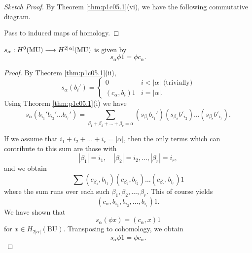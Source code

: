 \documentclass[../main]{subfiles}
\begin{document}
\begin{proof}[Sketch Proof]
By Theorem \ref{thm:p1c05.1}(vi), we have the following commutative diagram.

\begin{center}
\end{center}

Pass to induced maps of homology.
\end{proof} 

\begin{corollary}
\label{cor:p1c05.3}
$s_\alpha : H^0(\mathrm{MU}) \overset{}{\longrightarrow} H^{2|\alpha|} (\mathrm{MU})$ is given by $$s_\alpha \phi 1 = \phi c_\alpha.$$
\end{corollary}

\begin{proof}
By Theorem \ref{thm:p1c05.1}(ii), $$s_\alpha(b_i') = \begin{cases}0 & i < |\alpha| \text { (trivially)} \\ (c_\alpha, b_i) 1 & i = |\alpha|.\end{cases}$$ Using Theorem \ref{thm:p1c05.1}(i) we have $$s_\alpha (b_{i_1}' b_{i_2}' \ldots b_{i_r}') = \sum_{\beta_1 + \beta_2 + \ldots + \beta_r = \alpha} (s_{\beta_1} b_{i_1}') (s_{\beta_2} b'_{i_2}) \ldots (s_{\beta_r} b'_{i_r}).$$

If we assume that $i_1 + i_2 + \ldots + i_r = |\alpha|$, then the only terms which can contribute to this sum are those with $$|\beta_1| = i_1, \quad |\beta_2| = i_2, \ldots, |\beta_r| = i_r,$$ and we obtain $$\sum (c_{\beta_1}, b_{i_1}) (c_{\beta_2}, b_{i_2}) \ldots (c_{\beta_r}, b_{i_r}) 1$$ where the sum runs over each such $\beta_1, \beta_2, \ldots, \beta_r$. This of course yields $$(c_\alpha, b_{i_1}, b_{i_2}, \ldots, b_{i_r}) 1.$$ We have shown that $$s_\alpha(\phi x) = (c_\alpha, x) 1$$ for $x \in H_{2|\alpha|} (\mathrm{BU})$. Transposing to cohomology, we obtain $$s_\alpha \phi 1 = \phi c_\alpha.$$
\end{proof}
\end{document}
